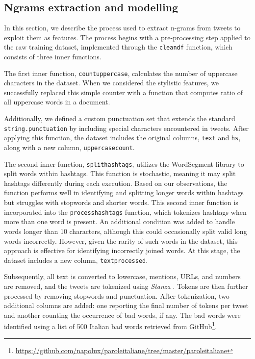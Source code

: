 \subsection{Ngrams extraction and modelling}
In this section, we describe the process used to extract n-grams from tweets to exploit them as features.
The process begins with a pre-processing step applied to the raw training dataset, implemented through the \texttt{clean\textunderscore df} function, which consists of three inner functions.

The first inner function, \texttt{count\textunderscore uppercase}, calculates the number of uppercase characters in the dataset.
When we considered the stylistic features, we successfully replaced this simple counter with a function that computes ratio of all uppercase words in a document.

Additionally, we defined a custom punctuation set that extends the standard \texttt{string.punctuation} by including special characters encountered in tweets.
After applying this function, the dataset includes the original columns, \texttt{text} and \texttt{hs}, along with a new column, \texttt{uppercase\textunderscore count}.

The second inner function, \texttt{split\textunderscore hashtags}, utilizes the WordSegment library to split words within hashtags. This function is stochastic, meaning it may split hashtags differently during each execution. Based on our observations, the function performs well in identifying and splitting longer words within hashtags but struggles with stopwords and shorter words. This second inner function is incorporated into the \texttt{process\textunderscore hashtags} function, which tokenizes hashtags when more than one word is present. An additional condition was added to handle words longer than 10 characters, although this could occasionally split valid long words incorrectly. However, given the rarity of such words in the dataset, this approach is effective for identifying incorrectly joined words.
At this stage, the dataset includes a new column, \texttt{text\textunderscore processed}.

Subsequently, all text is converted to lowercase, mentions, URLs, and numbers are removed, and the tweets are tokenized using \emph{Stanza} \cite{stanza}.
Tokens are then further processed by removing stopwords and punctuation.
After tokenization, two additional columns are added: one reporting the final number of tokens per tweet and another counting the occurrence of bad words, if any.
The bad words were identified using a list of 500 Italian bad words retrieved from GitHub\footnote{\url{https://github.com/napolux/paroleitaliane/tree/master/paroleitaliane}}.

